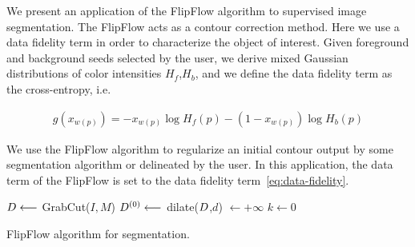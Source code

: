 We present an application of the FlipFlow algorithm to supervised image segmentation. The FlipFlow acts as a contour correction method. Here we use a data fidelity term in order to characterize the object of interest. Given foreground and background seeds selected by the user, we derive mixed Gaussian distributions of color intensities $H_f$,$H_b$, and we define the data fidelity term as the cross-entropy, i.e.
	
\begin{align}
  g(x_{w(p)}) = -x_{w(p)}\log{H_f(p)} - (1-x_{w(p)})\log{H_b(p)}
  \label{eq:data-fidelity}
\end{align}	

We use the FlipFlow algorithm to regularize an initial contour output by some segmentation algorithm or delineated by the user. In this application, the data term of the FlipFlow
is set to the data fidelity term~\cref{eq:data-fidelity}.
	
\begin{algorithm}
 
 \BlankLine

 $D \longleftarrow$ GrabCut($I,M$)\;
 $D^{(0)} \longleftarrow $ dilate($D$,$d$)\; 
 \Delta $\longleftarrow +\infty$\;
 $k \longleftarrow 0$\;
 \caption{FlipFlow algorithm for segmentation.}
  \label{alg:contour-correction} 
\end{algorithm}	


